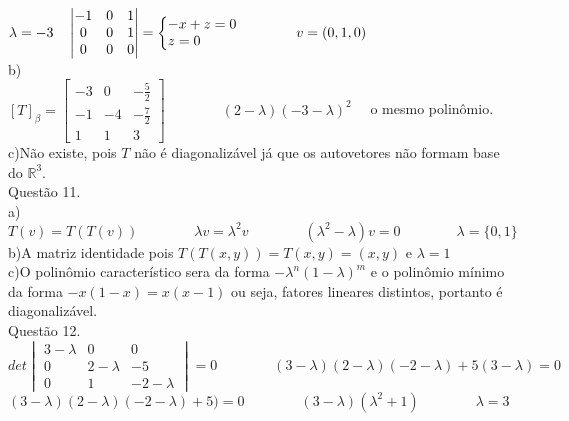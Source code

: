 \documentclass[12pt]{article}
\begin{document}
$\lambda=-3\quad\begin{vmatrix}-1&0&1\\0&0&1\\0&0&0\end{vmatrix}=\left\{\begin{array}{@{}l@{}}-x+z=0\\z=0\end{array}\right.\qquad\qquad v=(0,1,0)$\\

\noindent b)\\

$[T]_{\beta}=\begin{bmatrix}-3&0&-\frac{5}{2}\\-1&-4&-\frac{7}{2}\\1&1&3\end{bmatrix}\qquad\qquad (2-\lambda)(-3-\lambda)^{2}\quad$ o mesmo polinômio.\\

\noindent c)\quad Não existe, pois $T$ não é diagonalizável já que os autovetores não formam base do $\mathds{R}^{3}$.\\

\noindent Questão 11.\\

\noindent a)\quad $T(v)=T(T(v))\qquad\qquad\lambda v=\lambda^{2}v\qquad\qquad(\lambda^{2}-\lambda)v=0\qquad\qquad\lambda=\lbrace0,1\rbrace$\\

\noindent b)\quad A matriz identidade pois $T(T(x,y))=T(x,y)=(x,y)$ e $\lambda=1$\\

\noindent c)\quad O polinômio característico sera da forma $-\lambda^{n}(1-\lambda)^{m}$ e o polinômio mínimo da forma $-x(1-x)=x(x-1)$ ou seja, fatores lineares distintos, portanto é diagonalizável.\\

\noindent Questão 12.\\

$det\begin{vmatrix}3-\lambda&0&0\\0&2-\lambda&-5\\0&1&-2-\lambda\end{vmatrix}=0\qquad\qquad(3-\lambda)(2-\lambda)(-2-\lambda)+5(3-\lambda)=0$\\

$(3-\lambda)(2-\lambda)(-2-\lambda)+5)=0\qquad\qquad(3-\lambda)(\lambda^{2}+1)\qquad\qquad\lambda=3$\\
\end{document}
